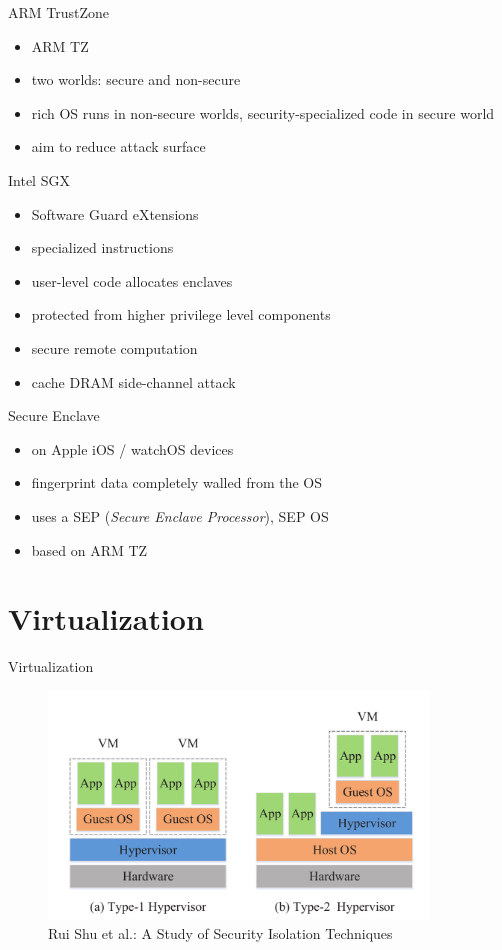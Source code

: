 \documentclass{curs}
\begin{document}
\begin{frame}{ARM TrustZone}
  \begin{itemize}
    \item ARM TZ
    \item two worlds: secure and non-secure
    \item rich OS runs in non-secure worlds, security-specialized code in secure world
    \item aim to reduce attack surface
  \end{itemize}
\end{frame}

\begin{frame}{Intel SGX}
  \begin{itemize}
    \item Software Guard eXtensions
    \item specialized instructions
    \item user-level code allocates enclaves
    \item protected from higher privilege level components
    \item secure remote computation
    \item cache DRAM side-channel attack
  \end{itemize}
\end{frame}

\begin{frame}{Secure Enclave}
  \begin{itemize}
    \item on Apple iOS / watchOS devices
    \item fingerprint data completely walled from the OS
    \item uses a SEP (\textit{Secure Enclave Processor}), SEP OS
    \item based on ARM TZ
  \end{itemize}
\end{frame}

\section{Virtualization}

\begin{frame}{Virtualization}
  \begin{figure}
    \centering
    \includegraphics[width=0.9\textwidth]{img/virtualization} \\
    {\tiny Rui Shu et al.: A Study of Security Isolation Techniques}
  \end{figure}
\end{frame}
\end{document}
